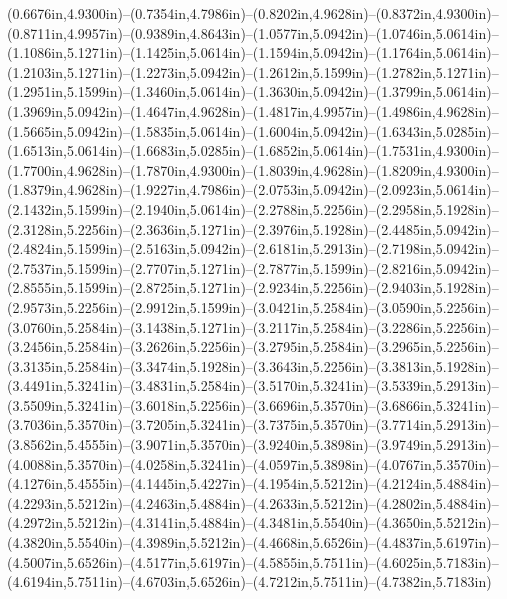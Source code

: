 (0.6676in,4.9300in)--(0.7354in,4.7986in)--(0.8202in,4.9628in)--(0.8372in,4.9300in)--(0.8711in,4.9957in)--(0.9389in,4.8643in)--(1.0577in,5.0942in)--(1.0746in,5.0614in)--(1.1086in,5.1271in)--(1.1425in,5.0614in)--(1.1594in,5.0942in)--(1.1764in,5.0614in)--(1.2103in,5.1271in)--(1.2273in,5.0942in)--(1.2612in,5.1599in)--(1.2782in,5.1271in)--(1.2951in,5.1599in)--(1.3460in,5.0614in)--(1.3630in,5.0942in)--(1.3799in,5.0614in)--(1.3969in,5.0942in)--(1.4647in,4.9628in)--(1.4817in,4.9957in)--(1.4986in,4.9628in)--(1.5665in,5.0942in)--(1.5835in,5.0614in)--(1.6004in,5.0942in)--(1.6343in,5.0285in)--(1.6513in,5.0614in)--(1.6683in,5.0285in)--(1.6852in,5.0614in)--(1.7531in,4.9300in)--(1.7700in,4.9628in)--(1.7870in,4.9300in)--(1.8039in,4.9628in)--(1.8209in,4.9300in)--(1.8379in,4.9628in)--(1.9227in,4.7986in)--(2.0753in,5.0942in)--(2.0923in,5.0614in)--(2.1432in,5.1599in)--(2.1940in,5.0614in)--(2.2788in,5.2256in)--(2.2958in,5.1928in)--(2.3128in,5.2256in)--(2.3636in,5.1271in)--(2.3976in,5.1928in)--(2.4485in,5.0942in)--(2.4824in,5.1599in)--(2.5163in,5.0942in)--(2.6181in,5.2913in)--(2.7198in,5.0942in)--(2.7537in,5.1599in)--(2.7707in,5.1271in)--(2.7877in,5.1599in)--(2.8216in,5.0942in)--(2.8555in,5.1599in)--(2.8725in,5.1271in)--(2.9234in,5.2256in)--(2.9403in,5.1928in)--(2.9573in,5.2256in)--(2.9912in,5.1599in)--(3.0421in,5.2584in)--(3.0590in,5.2256in)--(3.0760in,5.2584in)--(3.1438in,5.1271in)--(3.2117in,5.2584in)--(3.2286in,5.2256in)--(3.2456in,5.2584in)--(3.2626in,5.2256in)--(3.2795in,5.2584in)--(3.2965in,5.2256in)--(3.3135in,5.2584in)--(3.3474in,5.1928in)--(3.3643in,5.2256in)--(3.3813in,5.1928in)--(3.4491in,5.3241in)--(3.4831in,5.2584in)--(3.5170in,5.3241in)--(3.5339in,5.2913in)--(3.5509in,5.3241in)--(3.6018in,5.2256in)--(3.6696in,5.3570in)--(3.6866in,5.3241in)--(3.7036in,5.3570in)--(3.7205in,5.3241in)--(3.7375in,5.3570in)--(3.7714in,5.2913in)--(3.8562in,5.4555in)--(3.9071in,5.3570in)--(3.9240in,5.3898in)--(3.9749in,5.2913in)--(4.0088in,5.3570in)--(4.0258in,5.3241in)--(4.0597in,5.3898in)--(4.0767in,5.3570in)--(4.1276in,5.4555in)--(4.1445in,5.4227in)--(4.1954in,5.5212in)--(4.2124in,5.4884in)--(4.2293in,5.5212in)--(4.2463in,5.4884in)--(4.2633in,5.5212in)--(4.2802in,5.4884in)--(4.2972in,5.5212in)--(4.3141in,5.4884in)--(4.3481in,5.5540in)--(4.3650in,5.5212in)--(4.3820in,5.5540in)--(4.3989in,5.5212in)--(4.4668in,5.6526in)--(4.4837in,5.6197in)--(4.5007in,5.6526in)--(4.5177in,5.6197in)--(4.5855in,5.7511in)--(4.6025in,5.7183in)--(4.6194in,5.7511in)--(4.6703in,5.6526in)--(4.7212in,5.7511in)--(4.7382in,5.7183in)
